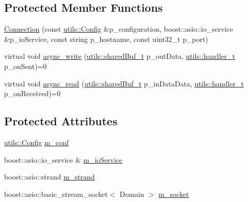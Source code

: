 \subsection*{Protected Member Functions}
\begin{DoxyCompactItemize}
\item 
\hyperlink{classxtd_1_1network_1_1base_1_1Connection_ac1ed59726de3423a3fc2e21e50d04542}{Connection} (const \hyperlink{classxtd_1_1network_1_1utils_1_1Config}{utils\+::\+Config} \&p\+\_\+configuration, boost\+::asio\+::io\+\_\+service \&p\+\_\+io\+Service, const string p\+\_\+hostname, const uint32\+\_\+t p\+\_\+port)
\item 
virtual void \hyperlink{classxtd_1_1network_1_1base_1_1Connection_a650bc7e13969ff9195c95307e0abb2e4}{async\+\_\+write} (\hyperlink{namespacextd_1_1network_1_1utils_a92b366b7e2a1ab09ac4f4a0401f8fb84}{utils\+::shared\+Buf\+\_\+t} p\+\_\+out\+Data, \hyperlink{namespacextd_1_1network_1_1utils_ac8a6f796cd645f83cde023d163665bb5}{utils\+::handler\+\_\+t} p\+\_\+on\+Sent)=0
\item 
virtual void \hyperlink{classxtd_1_1network_1_1base_1_1Connection_ab468f8470260b0ce42b5accf29c352e6}{async\+\_\+read} (\hyperlink{namespacextd_1_1network_1_1utils_a92b366b7e2a1ab09ac4f4a0401f8fb84}{utils\+::shared\+Buf\+\_\+t} p\+\_\+in\+Data\+Data, \hyperlink{namespacextd_1_1network_1_1utils_ac8a6f796cd645f83cde023d163665bb5}{utils\+::handler\+\_\+t} p\+\_\+on\+Received)=0
\end{DoxyCompactItemize}
\subsection*{Protected Attributes}
\begin{DoxyCompactItemize}
\item 
\hyperlink{classxtd_1_1network_1_1utils_1_1Config}{utils\+::\+Config} \hyperlink{classxtd_1_1network_1_1base_1_1Connection_a84f0cc65067a6d89a087754ad658f00b}{m\+\_\+conf}
\item 
boost\+::asio\+::io\+\_\+service \& \hyperlink{classxtd_1_1network_1_1base_1_1Connection_aee549e0f84206cc897371ec3ba2cba49}{m\+\_\+io\+Service}
\item 
boost\+::asio\+::strand \hyperlink{classxtd_1_1network_1_1base_1_1Connection_afdbd7eaed6dc0b71b05a6ef3be2f417d}{m\+\_\+strand}
\item 
boost\+::asio\+::basic\+\_\+stream\+\_\+socket$<$ Domain $>$ \hyperlink{classxtd_1_1network_1_1base_1_1Connection_af054fe7efb3d4f8a1a0f40c0e74e8c70}{m\+\_\+socket}
\end{DoxyCompactItemize}


